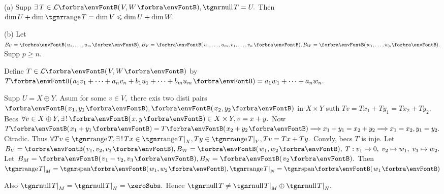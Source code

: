 \par\quad
(a) Supp $\exists\,T\in\Lm{V,W},\null T=U.$ Then $\dim U+\dim\range T=\dim V\leqslant\dim U+\dim W.$\par\quad
(b) Let $B_U=\Par{u_1,\dots,u_m},B_V=\Par{u_1,\dots,u_m,v_1,\dots,v_n},B_W=\Par{w_1,\dots,w_p}.$ Supp $p\geqslant n.$\par\quad\Hb
Define $T\in\Lm{V,W}$ by $T\Par{a_1 v_1+\dots+a_n v_n+b_1 u_1+\dots+b_m u_m}=a_1 w_1+\dots+a_n w_n.$\PfEnd
\SepLine\pagebreak


Supp $U=X\oplus Y.$ Asum for some $v\in V,$ there exis two disti pairs $\Par{x_1,y_1},\Par{x_2,y_2}$ in $X\times Y$\parSol{}
suth $Tv=Tx_1+Ty_1=Tx_2+Ty_2.$ Becs $\forall v\in X\oplus Y,\exists\,!\,\Par{x,y}\in X\times Y,v=x+y.$\parSol{}
Now $T\Par{x_1+y_1}=T\Par{x_2+y_2}\Longrightarrow x_1+y_1=x_2+y_2\Longrightarrow x_1=x_2,y_1=y_2.$ Ctradic.\parSol{}
Thus $\forall Tv\in\range T,\exists\,!\,Tx\in\range T\mmid_X,Ty\in\range T\mmid_Y,Tv=Tx+Ty.$ Convly, becs $T$ is inje.\PfEnd\vspace{2pt}
\AExa Let $B_V=\Par{v_1,v_2,v_3},B_W=\Par{w_1,w_2},\;T:v_1\mapsto 0,\;v_2\mapsto w_1,\;v_3\mapsto w_2.$\parExa
Let $B_M=\Par{v_1-v_2,v_3},B_N=\Par{v_2}.$ Then $\range T\mmid_M=\Span{w_1,w_2},\range T\mmid_N=\Span{w_1}$\par\vspace{2pt}
\AComm Also $\null T\mmid_M=\null T\mmid_N=\zeroSubs.$ Hence $\null T\neq\null T\mmid_M\oplus\null T\mmid_N.$
\SepLine

